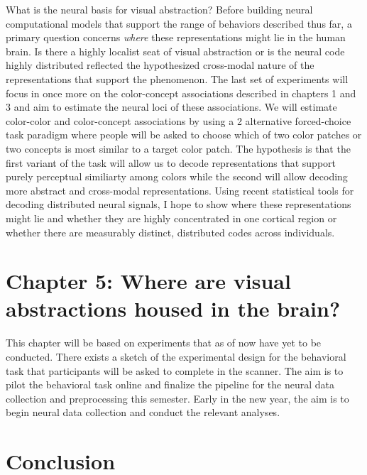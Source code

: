 \documentclass{Dissertate}
\begin{document}
What is the neural basis for visual abstraction? 
Before building neural computational models that support the range of behaviors described thus far, a primary question concerns \textit{where} these representations might lie in the human brain.
Is there a highly localist seat of visual abstraction or is the neural code highly distributed reflected the hypothesized cross-modal nature of the representations that support the phenomenon.
The last set of experiments will focus in once more on the color-concept associations described in chapters 1 and 3 and aim to estimate the neural loci of these associations.
We will estimate color-color and color-concept associations by using a 2 alternative forced-choice task paradigm where people will be asked to choose which of two color patches or two concepts is most similar to a target color patch.
The hypothesis is that the first variant of the task will allow us to decode representations that support purely perceptual similiarty among colors while the second will allow decoding more abstract and cross-modal representations.
Using recent statistical tools for decoding distributed neural signals, I hope to show where these representations might lie and whether they are highly concentrated in one cortical region or whether there are measurably distinct, distributed codes across individuals.


\section*{Chapter 5: Where are visual abstractions housed in the brain?}

\begin{tcolorbox}[
    colback=gray!10,  %
    colframe=black!50, %
    arc=4mm,         %
    boxrule=2pt      %
]
This chapter will be based on experiments that as of now have yet to be conducted.
There exists a sketch of the experimental design for the behavioral task that participants will be asked to complete in the scanner. 
The aim is to pilot the behavioral task online and finalize the pipeline for the neural data collection and preprocessing this semester.
Early in the new year, the aim is to begin neural data collection and conduct the relevant analyses.
\end{tcolorbox}


\section*{Conclusion}
\end{document}

